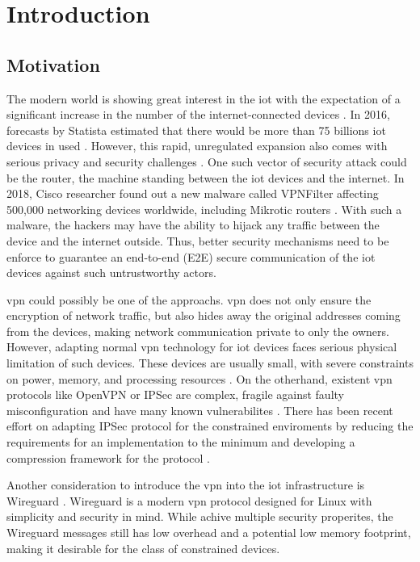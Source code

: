 \chapter{Introduction}
\section{Motivation}
  The modern world is showing great interest in the \gls{iot} with the expectation
  of a significant increase in the number of the internet-connected devices \cite{things}. In 2016, forecasts by 
  Statista estimated that there would be more than 75 billions \gls{iot} devices in used \cite{stat}. 
  However, this rapid, unregulated expansion also comes with serious privacy and security challenges \cite{chals}.
  One such vector of security attack could be the router, the machine standing between the \gls{iot}
  devices and the internet. In 2018, Cisco researcher found out a new malware called VPNFilter
  affecting 500,000 networking devices worldwide, including Mikrotic routers \cite{router}. 
  With such a malware, the hackers may have the ability to hijack any traffic between
  the device and the internet outside. Thus, better security mechanisms need to be enforce
  to guarantee an end-to-end (E2E) secure communication of the \gls{iot} devices against such
  untrustworthy actors.

  \gls{vpn} could possibly be one of the approachs. \gls{vpn} does not only 
  ensure the encryption of network traffic, but also hides away the original addresses coming
  from the devices, making network communication private to only the owners. However, adapting
  normal \gls{vpn} technology for \gls{iot} devices faces serious physical limitation of such devices.
  These devices are usually small, with severe constraints on power, memory, 
  and processing resources \cite{rfc7228}. On the otherhand, existent \gls{vpn} protocols like OpenVPN or 
  IPSec are complex, fragile against faulty misconfiguration and have many known vulnerabilites \cite{pwu}. 
  There has been recent effort on adapting IPSec protocol for the constrained enviroments by
  reducing the requirements for an implementation to the minimum \cite{rfc9333} and developing
  a compression framework for the protocol \cite{ietf-ipsecme-diet-esp-01}. 

  Another consideration to introduce the \gls{vpn} into the \gls{iot} infrastructure is Wireguard \cite{wireguard}.
  Wireguard is a modern \gls{vpn} protocol designed for Linux with simplicity and security in mind.
  While achive multiple security properites, the Wireguard messages still has low overhead 
  and a potential low memory footprint, making it desirable for the class of constrained devices.

